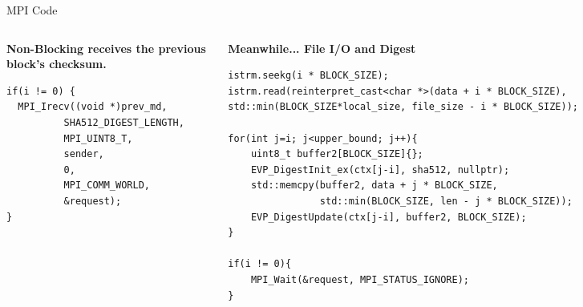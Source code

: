 \begin{frame}[fragile]{MPI Code}
    \begin{columns}
    \begin{column}{.5\textwidth}
        \textbf{\scriptsize Non-Blocking receives the previous block's checksum.}
            \begin{verbatim}
if(i != 0) {
  MPI_Irecv((void *)prev_md,
          SHA512_DIGEST_LENGTH,
          MPI_UINT8_T,
          sender,
          0,
          MPI_COMM_WORLD,
          &request);
}
              \end{verbatim}
        \end{column}
        
        \begin{column}{.5\textwidth}
        \textbf{\scriptsize Meanwhile... File I/O and Digest}
                \begin{verbatim}
istrm.seekg(i * BLOCK_SIZE);
istrm.read(reinterpret_cast<char *>(data + i * BLOCK_SIZE), std::min(BLOCK_SIZE*local_size, file_size - i * BLOCK_SIZE));

for(int j=i; j<upper_bound; j++){
    uint8_t buffer2[BLOCK_SIZE]{};
    EVP_DigestInit_ex(ctx[j-i], sha512, nullptr);
    std::memcpy(buffer2, data + j * BLOCK_SIZE,
                std::min(BLOCK_SIZE, len - j * BLOCK_SIZE));
    EVP_DigestUpdate(ctx[j-i], buffer2, BLOCK_SIZE);
}

if(i != 0){
    MPI_Wait(&request, MPI_STATUS_IGNORE);
}
              \end{verbatim}
        \end{column}
        
    \end{columns}
    
\end{frame}

